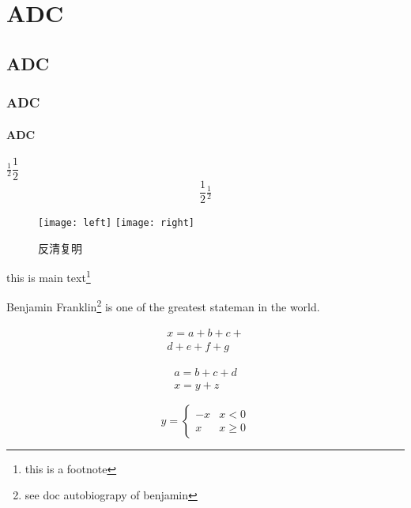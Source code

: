 \chapter{ADC}
\label{chapter: ADC}

\section{ADC}
\label{section: ADC}

\subsection{ADC}
\label{subsection: ADC}

\subsubsection*{ADC}
\label{subsubsection: ADC}

%
%
%
%

$\frac{1}{2} \dfrac{1}{2}$
\[\frac{1}{2} \tfrac{1}{2}\]


\begin{figure}[htbp]
\centering
\texttt{[image: left]}
\texttt{[image: right]}
\caption{反清复明}
\end{figure}


this is main text\footnote{this is a footnote}

Benjamin Franklin\footnote{see doc autobiograpy of benjamin} is one of the greatest stateman in the world.


\begin{multline}
	x=a+b+c+\\
	d+e+f+g
\end{multline}

\begin{gather}
	a=b+c+d\\
	x=y+z
\end{gather}

\[ y=\begin{cases}
-x & x<0\\
x & x\geq0
\end{cases} \]
